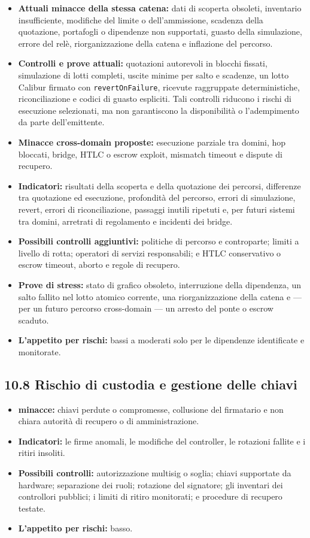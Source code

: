 \documentclass[11pt]{article}
\begin{document}
\begin{itemize}[leftmargin=*]
\item \textbf{ Attuali minacce della stessa catena:} dati di scoperta obsoleti, inventario insufficiente, modifiche del limite o dell'ammissione, scadenza della quotazione, portafogli o dipendenze non supportati, guasto della simulazione, errore del relè, riorganizzazione della catena e inflazione del percorso.
\item \textbf{Controlli e prove attuali:} quotazioni autorevoli in blocchi fissati, simulazione di lotti completi, uscite minime per salto e scadenze, un lotto Calibur firmato con \texttt{revertOnFailure}, ricevute raggruppate deterministiche, riconciliazione e codici di guasto espliciti. Tali controlli riducono i rischi di esecuzione selezionati, ma non garantiscono la disponibilità o l'adempimento da parte dell'emittente.
\item \textbf{ Minacce cross-domain proposte:} esecuzione parziale tra domini, hop bloccati, bridge, HTLC o escrow exploit, mismatch timeout e dispute di recupero.
\item \textbf{Indicatori:} risultati della scoperta e della quotazione dei percorsi, differenze tra quotazione ed esecuzione, profondità del percorso, errori di simulazione, revert, errori di riconciliazione, passaggi inutili ripetuti e, per futuri sistemi tra domini, arretrati di regolamento e incidenti dei bridge.
\item \textbf{ Possibili controlli aggiuntivi:} politiche di percorso e controparte; limiti a livello di rotta; operatori di servizi responsabili; e HTLC conservativo o escrow timeout, aborto e regole di recupero.
\item \textbf{Prove di stress:} stato di grafico obsoleto, interruzione della dipendenza, un salto fallito nel lotto atomico corrente, una riorganizzazione della catena e --- per un futuro percorso cross-domain --- un arresto del ponte o escrow scaduto.
\item \textbf{L'appetito per rischi:} bassi a moderati solo per le dipendenze identificate e monitorate.
\end{itemize}
\subsection*{10.8 Rischio di custodia e gestione delle chiavi}

\begin{itemize}[leftmargin=*]
\item \textbf{minacce:} chiavi perdute o compromesse, collusione del firmatario e non chiara autorità di recupero o di amministrazione.
\item \textbf{Indicatori:} le firme anomali, le modifiche del controller, le rotazioni fallite e i ritiri insoliti.
\item \textbf{Possibili controlli:} autorizzazione multisig o soglia; chiavi supportate da hardware; separazione dei ruoli; rotazione del signatore; gli inventari dei controllori pubblici; i limiti di ritiro monitorati; e procedure di recupero testate.
\item \textbf{L'appetito per rischi:} basso.
\end{itemize}
\end{document}
